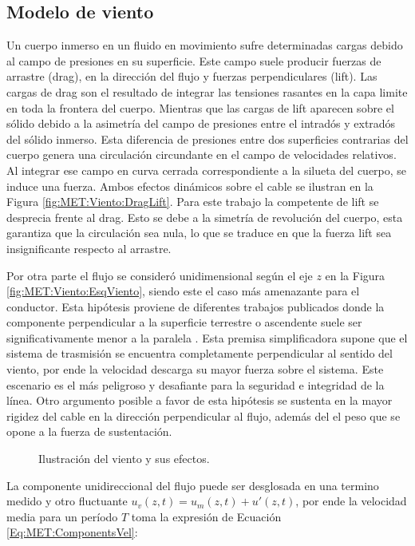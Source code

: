 \subsection{Modelo de viento}\label{Sec:PRE:Modeloviento}
Un cuerpo inmerso en un fluido en movimiento sufre determinadas cargas debido al campo de presiones en su superficie. Este campo suele producir fuerzas de arrastre (drag), en la dirección del flujo y fuerzas perpendiculares (lift). Las cargas de drag son el resultado de integrar las tensiones rasantes en la capa limite en toda la frontera del cuerpo. Mientras que las cargas de lift aparecen sobre el sólido debido a la asimetría del campo de presiones entre el intradós y extradós del sólido inmerso. Esta diferencia de presiones entre dos superficies contrarias del cuerpo genera una circulación circundante en el campo de velocidades relativos. Al integrar ese campo  en curva cerrada correspondiente a la silueta del cuerpo, se induce una fuerza. Ambos efectos dinámicos sobre el cable se ilustran en la Figura \ref{fig:MET:Viento:DragLift}. Para este trabajo la competente de lift se desprecia frente al drag.  Esto se debe a la simetría de revolución del cuerpo, esta garantiza que la circulación sea nula, lo que se traduce en que la fuerza lift sea insignificante respecto al arrastre. 

Por otra parte el flujo se consideró unidimensional según el eje $z$ en la Figura \ref{fig:MET:Viento:EsqViento}, siendo este el caso más amenazante para el conductor. Esta hipótesis proviene de diferentes trabajos publicados donde la componente perpendicular a la superficie terrestre o ascendente suele ser significativamente menor a la paralela \citep{duranona2009analysis} \citep{stengel2017measurements} \cite{yang2016nonlinear}. Esta premisa simplificadora supone que el sistema de trasmisión se encuentra completamente perpendicular al sentido del viento, por ende la velocidad descarga su mayor fuerza sobre el sistema. Este escenario es el más peligroso y desafiante para la seguridad e integridad de la línea. Otro argumento posible a favor de esta hipótesis se sustenta en la mayor rigidez del cable en la dirección perpendicular al flujo, además del el peso que se opone a la fuerza de sustentación.
\begingroup
\centering
\begin{figure}[htbp]
	\centering
	\label{fig:MET:Viento:EsqViento}
	\label{fig:MET:Viento:DragLift}
	\caption{Ilustración del viento y sus efectos.} 	\label{fig:Met:Viento:Esquemas}
\end{figure}
\endgroup
La componente unidireccional del flujo puede ser desglosada en una termino medido y otro fluctuante $u_v(z,t)=u_m(z,t)+{u}'(z,t)$, por ende la velocidad media para un período $T$ toma la expresión de Ecuación \eqref{Eq:MET:ComponentsVel}:


